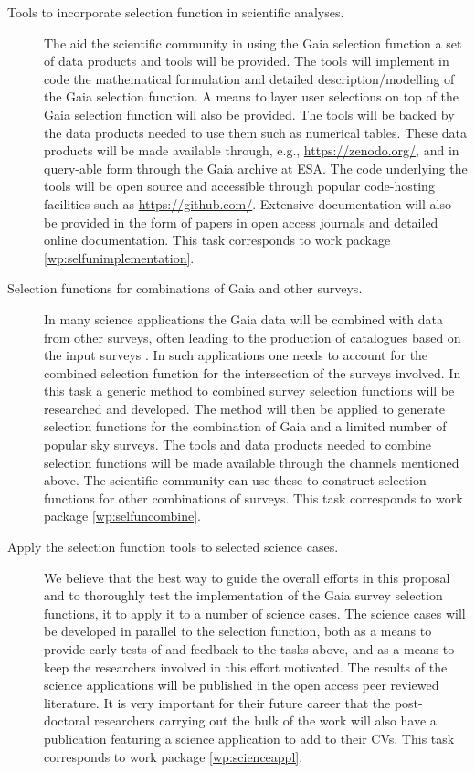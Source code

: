 \begin{description}
    \item[Tools to incorporate selection function in scientific analyses.] The aid the scientific community in using the Gaia selection function a set of data products and tools will be provided. The tools will implement in code the mathematical formulation and detailed description/modelling of the Gaia selection function. A means to layer user selections on top of the Gaia selection function will also be provided. The tools will be backed by the data products needed to use them such as numerical tables. These data products will be made available through, e.g., \url{https://zenodo.org/}, and in query-able form through the Gaia archive at ESA. The code underlying the tools will be open source and accessible through popular code-hosting facilities such as \url{https://github.com/}. Extensive documentation will also be provided in the form of papers in open access journals and detailed online documentation. This task corresponds to work package \ref{wp:selfunimplementation}.
    \item[Selection functions for combinations of Gaia and other surveys.] In many science applications the Gaia data will be combined with data from other surveys, often leading to the production of catalogues based on the input surveys \citep[see for example][]{2019A&A...628A..94A}. In such applications one needs to account for the combined selection function for the intersection of the surveys involved. In this task a generic method to combined survey selection functions will be researched and developed. The method will then be applied to generate selection functions for the combination of Gaia and a limited number of popular sky surveys. The tools and data products needed to combine selection functions will be made available through the channels mentioned above. The scientific community can use these to construct selection functions for other combinations of surveys. This task corresponds to work package \ref{wp:selfuncombine}.
    \item[Apply the selection function tools to selected science cases.] We believe that the best way to guide the overall efforts in this proposal and to thoroughly test the implementation of the Gaia survey selection functions, it to apply it to a number of science cases. The science cases will be developed in parallel to the selection function, both as a means to provide early tests of and feedback to the tasks above, and as a means to keep the researchers involved in this effort motivated. The results of the science applications will be published in the open access peer reviewed literature. It is very important for their future career that the post-doctoral researchers carrying out the bulk of the work will also have a publication featuring a science application to add to their CVs. This task corresponds to work package \ref{wp:scienceappl}.
\end{description}

